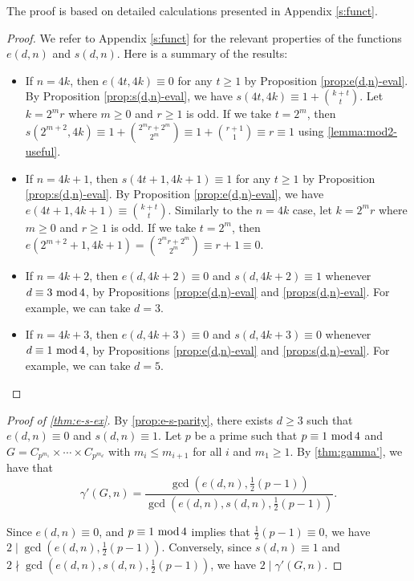 \documentclass[11pt,a4paper,leqno]{amsart}
\theoremstyle{definition}
\theoremstyle{remark}
\renewcommand{\mod}{\,\,\text{\normalfont mod}\,}
\begin{document}
The proof is based on detailed calculations presented in Appendix \ref{s:funct}. 

\begin{proof}
We refer to Appendix \ref{s:funct} for the relevant properties of the functions $e(d,n)$ and $s(d,n)$. Here is a summary of the results:

\begin{itemize}
\item If $n = 4k$, then $e(4t,4k) \equiv 0$ for any $t \ge 1$ by Proposition \ref{prop:e(d,n)-eval}. By Proposition \ref{prop:s(d,n)-eval}, we have $s(4t,4k) \equiv 1 + \binom{k+t}{t}$. Let $k = 2^m r$ where $m \ge 0$ and $r \ge 1$ is odd. If we take $t = 2^m$, then $s(2^{m+2},4k) \equiv 1+\binom{2^mr+2^m}{2^m} \equiv 1 + \binom{r+1}{1} \equiv r \equiv 1$ using \cref{lemma:mod2-useful}.

\item If $n = 4k+1$, then $s(4t+1,4k+1) \equiv 1$ for any $t \ge 1$ by Proposition \ref{prop:s(d,n)-eval}. By Proposition \ref{prop:e(d,n)-eval}, we have $e(4t+1,4k+1) \equiv \binom{k+t}{t}$. Similarly to the $n =4k$ case, let $k = 2^m r$ where $m \ge 0$ and $r \ge 1$ is odd. If we take $t = 2^m$, then $e(2^{m+2}+1,4k+1) = \binom{2^mr+2^m}{2^m} \equiv r+1 \equiv 0$.

\item If $n = 4k+2$, then $e(d,4k+2) \equiv 0$ and $s(d,4k+2) \equiv 1$ whenever $d \equiv 3 \mod 4$, by Propositions \ref{prop:e(d,n)-eval} and \ref{prop:s(d,n)-eval}. For example, we can take $d = 3$.

\item If $n = 4k+3$, then	$e(d,4k+3) \equiv 0$ and $s(d,4k+3) \equiv 0$ whenever $d \equiv 1 \mod 4$, by Propositions \ref{prop:e(d,n)-eval} and \ref{prop:s(d,n)-eval}. For example, we can take $d = 5$. \qedhere
\end{itemize}
\end{proof}

\begin{proof}[Proof of \cref{thm:e-s-ex}]
By \cref{prop:e-s-parity}, there exists $d \ge 3$ such that $e(d,n) \equiv 0$ and $s(d,n) \equiv 1$. Let $p$ be a prime such that $p \equiv 1 \mod 4$ and $G = C_{p^{m_1}} \times \cdots \times C_{p^{m_d}}$ with $m_i \le m_{i+1}$ for all $i$ and $m_1 \ge 1$.
By \cref{thm:gamma'}, we have that
\[ \gamma'(G,n) = \frac{\gcd(e(d,n),\frac{1}{2}(p-1))}{\gcd(e(d,n),s(d,n),\frac{1}{2}(p-1))}.
 \]

Since $e(d,n) \equiv 0$,  and $p \equiv 1 \mod 4$ implies that $\frac{1}{2}(p-1) \equiv 0$,  we have $2 \mid \gcd(e(d,n),\frac{1}{2}(p-1))$. Conversely, since $s(d,n) \equiv 1$ and $2 \nmid \gcd(e(d,n),s(d,n),\frac{1}{2}(p-1))$, we have $2 \mid \gamma'(G,n)$.	
\end{proof}
\end{document}
